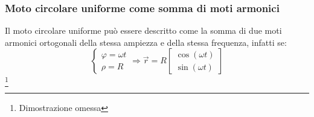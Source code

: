         \subsubsection{Moto circolare uniforme come somma di moti armonici}
            Il moto circolare uniforme può essere descritto come la somma di due moti armonici ortogonali della stessa ampiezza e della stessa frequenza, infatti se:
            $$
                \begin{cases}
                    \varphi = \omega t\\
                    \rho = R
                \end{cases} \Rightarrow \vec{r} = R\begin{bmatrix} \cos(\omega t)\\ \sin(\omega t) \end{bmatrix}
            $$\footnote{Dimostrazione omessa}
